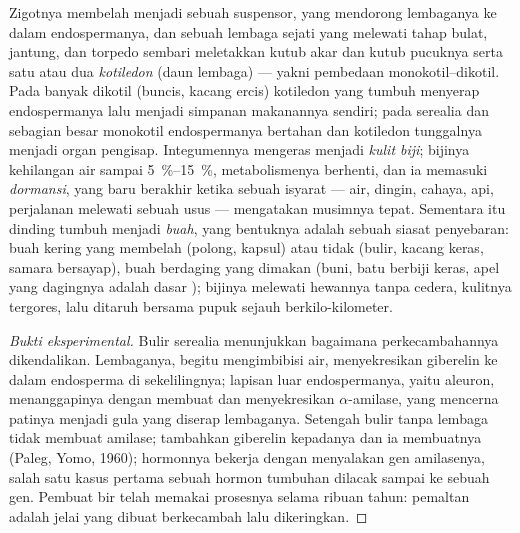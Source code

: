 \begin{definition}\label{def:b2:angiosperm-reproduction:seed}
Zigotnya membelah menjadi sebuah suspensor, yang mendorong lembaganya
ke dalam endospermanya, dan sebuah lembaga sejati yang melewati tahap
bulat, jantung, dan torpedo sembari meletakkan kutub akar dan kutub
pucuknya serta satu atau dua \emph{kotiledon} (daun lembaga) --- yakni
pembedaan monokotil--dikotil. Pada banyak dikotil (buncis, kacang
ercis) kotiledon yang tumbuh menyerap endospermanya lalu menjadi
simpanan makanannya sendiri; pada serealia dan sebagian besar monokotil
endospermanya bertahan dan kotiledon tunggalnya menjadi organ pengisap.
Integumennya mengeras menjadi \emph{kulit biji}; bijinya kehilangan air
sampai \qtyrange{5}{15}{\%}, metabolismenya berhenti, dan ia memasuki
\emph{dormansi}, yang baru berakhir ketika sebuah isyarat --- air,
dingin, cahaya, api, perjalanan melewati sebuah usus --- mengatakan
musimnya tepat. Sementara itu dinding  tumbuh menjadi
\emph{buah}, yang bentuknya adalah sebuah siasat penyebaran: buah
kering yang membelah (polong, kapsul) atau tidak (bulir, kacang keras,
samara bersayap), buah berdaging yang dimakan (buni, batu berbiji
keras, apel yang dagingnya adalah dasar ); bijinya melewati
hewannya tanpa cedera, kulitnya tergores, lalu ditaruh bersama pupuk
sejauh berkilo-kilometer.
\end{definition}
\begin{proof}[Bukti eksperimental]
Bulir serealia menunjukkan bagaimana perkecambahannya dikendalikan.
Lembaganya, begitu mengimbibisi air, menyekresikan giberelin ke dalam
endosperma di sekelilingnya; lapisan luar endospermanya, yaitu
aleuron, menanggapinya dengan membuat dan menyekresikan
$\alpha$-amilase, yang mencerna patinya menjadi gula yang diserap
lembaganya. Setengah bulir tanpa lembaga tidak membuat amilase;
tambahkan giberelin kepadanya dan ia membuatnya (Paleg, Yomo, 1960);
hormonnya bekerja dengan menyalakan gen amilasenya, salah satu kasus
pertama sebuah hormon tumbuhan dilacak sampai ke sebuah gen. Pembuat
bir telah memakai prosesnya selama ribuan tahun: pemaltan adalah jelai
yang dibuat berkecambah lalu dikeringkan.
\end{proof}

